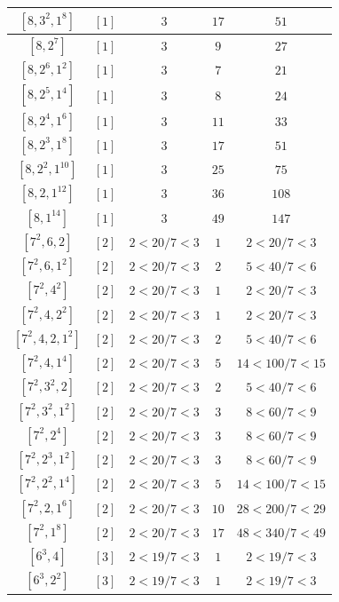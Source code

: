 \documentclass{article}%
\begin{document}
\begin{center}
\begin{longtable}{||c|c|c|c|c||}
$[8, 3^{2}, 1^{8}]$ & $[1]$ & $3$ & $17$ & $51$ \\ \hline 
$[8, 2^{7}]$ & $[1]$ & $3$ & $9$ & $27$ \\ \hline 
$[8, 2^{6}, 1^{2}]$ & $[1]$ & $3$ & $7$ & $21$ \\ \hline 
$[8, 2^{5}, 1^{4}]$ & $[1]$ & $3$ & $8$ & $24$ \\ \hline 
$[8, 2^{4}, 1^{6}]$ & $[1]$ & $3$ & $11$ & $33$ \\ \hline 
$[8, 2^{3}, 1^{8}]$ & $[1]$ & $3$ & $17$ & $51$ \\ \hline 
$[8, 2^{2}, 1^{10}]$ & $[1]$ & $3$ & $25$ & $75$ \\ \hline 
$[8, 2, 1^{12}]$ & $[1]$ & $3$ & $36$ & $108$ \\ \hline 
$[8, 1^{14}]$ & $[1]$ & $3$ & $49$ & $147$ \\ \hline 
$[7^{2}, 6, 2]$ & $[2]$ & $2 < 20/7 < 3$ & $1$ & $2 < 20/7 < 3$ \\ \hline 
$[7^{2}, 6, 1^{2}]$ & $[2]$ & $2 < 20/7 < 3$ & $2$ & $5 < 40/7 < 6$ \\ \hline 
$[7^{2}, 4^{2}]$ & $[2]$ & $2 < 20/7 < 3$ & $1$ & $2 < 20/7 < 3$ \\ \hline 
$[7^{2}, 4, 2^{2}]$ & $[2]$ & $2 < 20/7 < 3$ & $1$ & $2 < 20/7 < 3$ \\ \hline 
$[7^{2}, 4, 2, 1^{2}]$ & $[2]$ & $2 < 20/7 < 3$ & $2$ & $5 < 40/7 < 6$ \\ \hline 
$[7^{2}, 4, 1^{4}]$ & $[2]$ & $2 < 20/7 < 3$ & $5$ & $14 < 100/7 < 15$ \\ \hline 
$[7^{2}, 3^{2}, 2]$ & $[2]$ & $2 < 20/7 < 3$ & $2$ & $5 < 40/7 < 6$ \\ \hline 
$[7^{2}, 3^{2}, 1^{2}]$ & $[2]$ & $2 < 20/7 < 3$ & $3$ & $8 < 60/7 < 9$ \\ \hline 
$[7^{2}, 2^{4}]$ & $[2]$ & $2 < 20/7 < 3$ & $3$ & $8 < 60/7 < 9$ \\ \hline 
$[7^{2}, 2^{3}, 1^{2}]$ & $[2]$ & $2 < 20/7 < 3$ & $3$ & $8 < 60/7 < 9$ \\ \hline 
$[7^{2}, 2^{2}, 1^{4}]$ & $[2]$ & $2 < 20/7 < 3$ & $5$ & $14 < 100/7 < 15$ \\ \hline 
$[7^{2}, 2, 1^{6}]$ & $[2]$ & $2 < 20/7 < 3$ & $10$ & $28 < 200/7 < 29$ \\ \hline 
$[7^{2}, 1^{8}]$ & $[2]$ & $2 < 20/7 < 3$ & $17$ & $48 < 340/7 < 49$ \\ \hline 
$[6^{3}, 4]$ & $[3]$ & $2 < 19/7 < 3$ & $1$ & $2 < 19/7 < 3$ \\ \hline 
$[6^{3}, 2^{2}]$ & $[3]$ & $2 < 19/7 < 3$ & $1$ & $2 < 19/7 < 3$ \\ \hline 

\end{longtable}
\end{center}
\end{document}
